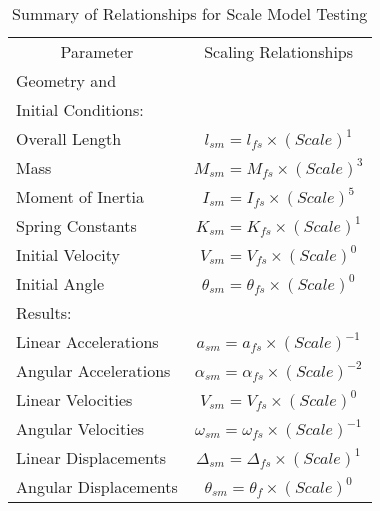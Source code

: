 \begin{table}
\begin{center}
\caption{Summary of Relationships for Scale Model Testing}
\makeqnum
\begin{tabular}{||l|c||}
\hline
\multicolumn{1}{|c}{Parameter}
 &\multicolumn{1}{|c||}{Scaling Relationships}\\
Geometry and & \\
Initial Conditions: &\\
\quad Overall Length     & $l_{sm} = l_{fs} \times (Scale)^{1}$\\
\quad Mass               & $M_{sm} = M_{fs} \times (Scale)^{3}$\\
\quad Moment of Inertia  & $I_{sm} = I_{fs} \times (Scale)^{5}$\\
\quad Spring Constants   & $K_{sm} = K_{fs} \times (Scale)^{1}$\\
\quad Initial Velocity   & $V_{sm} = V_{fs} \times (Scale)^{0}$\\
\quad Initial Angle      & $\theta _{sm} = \theta _{fs} \times 
(Scale)^{0}$\\
\hline
Results: & \\
\quad    Linear Accelerations  & $a_{sm} = a_{fs} \times (Scale)^{-1}$\\
\quad    Angular Accelerations & $\alpha _{sm} = \alpha _{fs} \times 
(Scale)^{-2}$\\
\quad    Linear Velocities     & $V_{sm} = V_{fs} \times (Scale)^{0}$\\
\quad    Angular Velocities    & $\omega _{sm} = \omega _{fs} \times 
(Scale)^{-1}$\\
\quad    Linear Displacements  & $\Delta _{sm} = \Delta _{fs} \times 
(Scale)^{1}$\\
\quad    Angular Displacements & $\theta _{sm} = \theta _{f} \times 
(Scale)^{0}$\\
\hline
\end{tabular}
\end{center}
\end{table}

